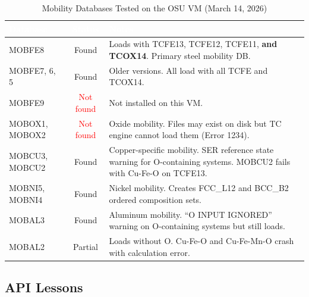 \documentclass[11pt]{article}
\begin{document}
\begin{table}[H]
\caption{Mobility Databases Tested on the OSU VM (March 14, 2026)}
\label{tab:mob_dbs}
\centering
\renewcommand{\arraystretch}{1.2}
\begin{tabular}{|l|c|p{3.2in}|}
\hline
\rowcolor{headercolor}
\textcolor{white}{\textbf{Database}} & \textcolor{white}{\textbf{Status}} & \textcolor{white}{\textbf{Notes}} \\
\hline
MOBFE8 & \textcolor{green!60!black}{Found} & Loads with TCFE13, TCFE12, TCFE11, \textbf{and TCOX14}. Primary steel mobility DB. \\
\hline
\rowcolor{altrow}
MOBFE7, 6, 5 & \textcolor{green!60!black}{Found} & Older versions. All load with all TCFE and TCOX14. \\
\hline
MOBFE9 & \textcolor{red}{Not found} & Not installed on this VM. \\
\hline
\rowcolor{altrow}
MOBOX1, MOBOX2 & \textcolor{red}{Not found} & Oxide mobility. Files may exist on disk but TC engine cannot load them (Error 1234). \\
\hline
MOBCU3, MOBCU2 & \textcolor{green!60!black}{Found} & Copper-specific mobility. SER reference state warning for O-containing systems. MOBCU2 fails with Cu-Fe-O on TCFE13. \\
\hline
\rowcolor{altrow}
MOBNI5, MOBNI4 & \textcolor{green!60!black}{Found} & Nickel mobility. Creates FCC\_L12 and BCC\_B2 ordered composition sets. \\
\hline
MOBAL3 & \textcolor{green!60!black}{Found} & Aluminum mobility. ``O INPUT IGNORED'' warning on O-containing systems but still loads. \\
\hline
\rowcolor{altrow}
MOBAL2 & Partial & Loads without O. Cu-Fe-O and Cu-Fe-Mn-O crash with calculation error. \\
\hline
\end{tabular}
\end{table}

\subsection{API Lessons}
\end{document}
